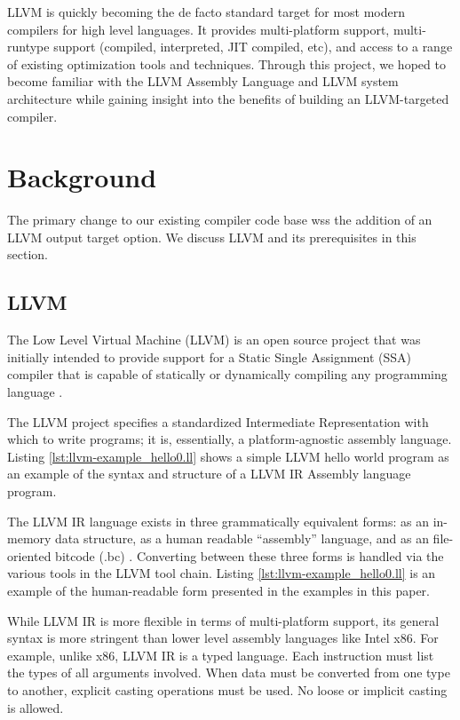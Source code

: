 \documentclass[11pt,twocolumn]{article}
\begin{document}
LLVM is quickly becoming the de facto standard target for most modern
compilers for high level languages.  It provides multi-platform
support, multi-runtype support (compiled, interpreted, JIT compiled,
etc), and access to a range of existing optimization tools and
techniques. Through this project, we hoped to become familiar with the
LLVM Assembly Language and LLVM system architecture while gaining
insight into the benefits of building an LLVM-targeted compiler.

\section{Background}

The primary change to our existing compiler code base wss the addition
of an LLVM output target option. We discuss LLVM and its prerequisites
in this section.

\subsection{LLVM}
\label{sec:LLVM}

The Low Level Virtual Machine (LLVM) is an open source project that
was initially intended to provide support for a Static Single
Assignment (SSA) compiler that is capable of statically or dynamically
compiling any programming language \cite{llvm.org}.

The LLVM project specifies a standardized Intermediate Representation with 
which to write programs; it is, essentially, a platform-agnostic assembly language. Listing \ref{lst:llvm-example_hello0.ll} shows
a simple LLVM hello world program as an example of
the syntax and structure of a LLVM IR Assembly language program.



The LLVM IR language exists in three grammatically equivalent forms:
as an in-memory data structure, as a human readable ``assembly''
language, and as an file-oriented bitcode (.bc) \cite{lattner-llvmlangref}.
Converting between these three forms is handled via the various tools
in the LLVM tool chain. Listing \ref{lst:llvm-example_hello0.ll} is an
example of the human-readable form presented in the examples in this paper.

While LLVM IR is more
flexible in terms of multi-platform support, its
general syntax is more stringent than lower level assembly languages
like Intel x86. For example, unlike x86, LLVM IR is a typed language.
Each instruction must list the types of all arguments involved. When
data must be converted from one type to another, explicit casting
operations must be used. No loose or implicit casting is allowed.
\end{document}
